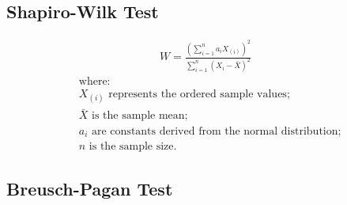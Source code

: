 \subsection{Shapiro-Wilk Test}
    \label{annexes:methodologie-ols-shapiro-wilk}

    \begin{equation}
    \label{annexes:equation:shapiro-wilk}
    \begin{aligned}
W = \frac{\left( \sum_{i=1}^{n} a_i X_{(i)} \right)^2}{\sum_{i=1}^{n} (X_i - \bar{X})^2}
    \end{aligned}
    \end{equation}
\begin{align*}
    &\text{where:} \\
    &X_{(i)} \text{ represents the ordered sample values;} \\
    &\bar{X} \text{ is the sample mean;} \\
    &a_i \text{ are constants derived from the normal distribution;} \\
    &n \text{ is the sample size.}
\end{align*}

\subsection{Breusch-Pagan Test}
    \label{annexes:methodologie-ols-breusch-pagan}

